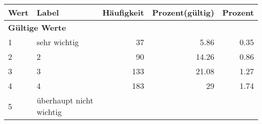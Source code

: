      \begin{longtable}{lXrrr}
     \toprule
     \textbf{Wert} & \textbf{Label} & \textbf{Häufigkeit} & \textbf{Prozent(gültig)} & \textbf{Prozent} \\
     \endhead
     \midrule
     \multicolumn{5}{l}{\textbf{Gültige Werte}}\\

     1 &
     \multicolumn{1}{X}{ sehr wichtig   } &


       \num{37} &
       \num[round-mode=places,round-precision=2]{5.86} &
         \num[round-mode=places,round-precision=2]{0.35} \\

     2 &
     \multicolumn{1}{X}{ 2   } &


       \num{90} &
       \num[round-mode=places,round-precision=2]{14.26} &
         \num[round-mode=places,round-precision=2]{0.86} \\

     3 &
     \multicolumn{1}{X}{ 3   } &


       \num{133} &
       \num[round-mode=places,round-precision=2]{21.08} &
         \num[round-mode=places,round-precision=2]{1.27} \\

     4 &
     \multicolumn{1}{X}{ 4   } &


       \num{183} &
       \num[round-mode=places,round-precision=2]{29} &
         \num[round-mode=places,round-precision=2]{1.74} \\

     5 &
     \multicolumn{1}{X}{ überhaupt nicht wichtig   } &



\end{longtable}
